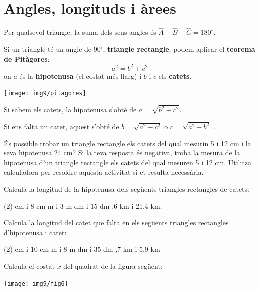 \section{Angles, longituds i àrees}

\begin{theorybox}
	Per qualsevol triangle, la suma dels seus angles és $\hat A + \hat B+ \hat C = 180^\circ$.
	
	\begin{minipage}{0.6\textwidth}
		Si un triangle té un angle de 90$^\circ$, \textbf{triangle rectangle}, podem aplicar el \textbf{teorema de Pitàgores}:
		\[a^2 = b^2 + c^2 \]
		on $a$ és la \textbf{hipotenusa} (el costat més llarg) i $b$ i $c$ els \textbf{catets}.
	\end{minipage}
\begin{minipage}{0.4\textwidth}
	\centering
	\texttt{[image: img9/pitagores]}
\end{minipage}

Si sabem els catets, la hipotenusa s'obté de  $a=\sqrt{b^2+c^2}$.

Si ens falta un catet, aquest s'obté de $b=\sqrt{a^2-c^2}$  o $c=\sqrt{a^2-b^2}$ .
\end{theorybox}
 

\begin{mylist}
\exer  És possible trobar un triangle rectangle els catets del qual mesurin 5 i 12 cm i la seva hipotenusa 24 cm? Si la teva resposta és negativa, troba la mesura de la hipotenusa d'un triangle rectangle els catets del qual mesuren 5 i 12 cm. Utilitza calculadora per resoldre aquesta activitat si et resulta necessària. 


\exer  Calcula la longitud de la hipotenusa dels següents triangles rectangles de catets:

\begin{tasks}(2)
	 cm i 8 cm   
	 m i 3 m
	 dm i 15 dm  
	,6 km i 21,4 km.
\end{tasks}
\answers[cols=2]{[10 cm, 5 m, 17 dm, 25.4 km]}

\exer  Calcula la longitud del catet que falta en els següents triangles rectangles d'hipotenusa i catet:

\begin{tasks}(2)
	 cm i 10 cm   
	 m i 8 m
	 dm i 35 dm  
	,7 km i 5,9 km
\end{tasks}
\answers[cols=2]{[24 cm,  15 m, 12 dm, 13.5 km]}

\exer[1] \hot  Calcula el costat $x$ del quadrat de la figura següent:
\begin{center}
 \texttt{[image: img9/fig6]}
\end{center}

\end{mylist}
	
